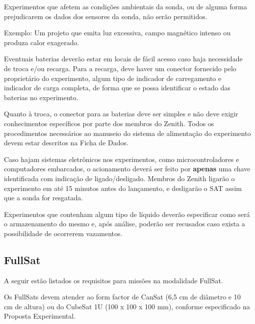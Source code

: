     \begin{definition}[8]
    Experimentos que afetem as condições ambientais da sonda, ou de alguma forma prejudicarem os dados dos sensores da sonda, não serão permitidos.
    
    Exemplo: Um projeto que emita luz excessiva, campo magnético intenso ou produza calor exagerado.
    \end{definition}
    
    \begin{definition}[9]
    Eventuais baterias deverão estar em locais de fácil acesso caso haja necessidade de troca e/ou recarga. Para a recarga, deve haver um conector fornecido pelo proprietário do experimento,  algum tipo de indicador de carregamento e indicador de carga completa, de forma que se possa identificar o estado das baterias no experimento.
    
    Quanto à troca, o conector para as baterias deve ser simples e não deve exigir conhecimentos específicos por parte dos membros do Zenith. Todos os procedimentos necessários ao manuseio do sistema de alimentação do experimento devem estar descritos na Ficha de Dados.
    \end{definition}
    
    \begin{definition}[10]
    Caso hajam sistemas eletrônicos nos experimentos, como microcontroladores e computadores embarcados, o acionamento deverá ser feito por \textbf{apenas} uma chave identificada com indicação de ligado/desligado. Membros do Zenith ligarão o experimento em até 15 minutos antes do lançamento, e desligarão o SAT assim que a sonda for resgatada.
    \end{definition}
    
    \begin{definition}[11]
    Experimentos que contenham algum tipo de líquido deverão especificar como será o armazenamento do mesmo e, após análise, poderão ser recusados caso exista a possibilidade de ocorrerem vazamentos.
    \end{definition}
    

    \subsection{FullSat}
    A seguir estão listados os requisitos para missões na modalidade FullSat.

    \begin{definition}[1]
    Os FullSats devem atender ao form factor de CanSat (6,5 cm de diâmetro e 10 cm de altura) ou do CubeSat 1U (100 x 100 x 100 mm), conforme especificado na Proposta Experimental.
    \end{definition}

